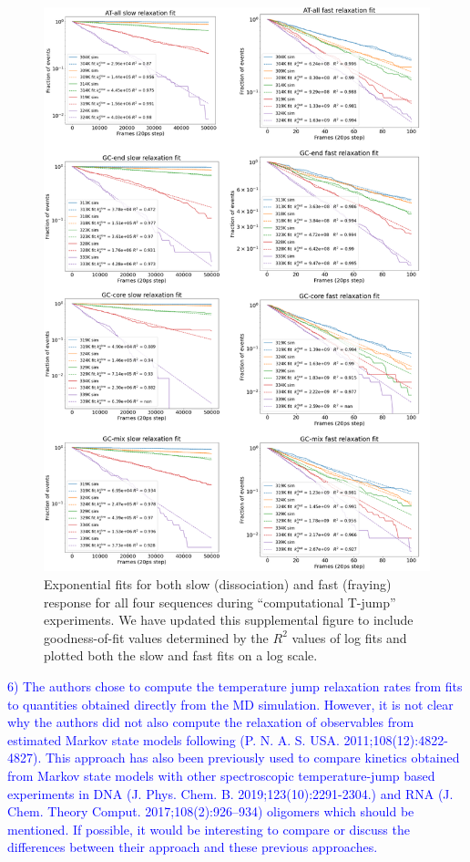 \documentclass[11pt,a4paper]{letter} %
\begin{document}
\begin{figure}[ht!]
	\begin{center}
        \includegraphics[width=120mm]{cover_letter/revision_figures/goodness_of_fit.png}
        \caption{Exponential fits for both slow (dissociation) and fast (fraying) response for all four sequences during ``computational T-jump'' experiments. We have updated this supplemental figure to include goodness-of-fit values determined by the $R^2$ values of log fits and plotted both the slow and fast fits on a log scale.}
        \label{fig:goodness-of-fit}
	\end{center}
\end{figure}

\textcolor{blue}{6)       The authors chose to compute the temperature jump relaxation rates from fits to quantities obtained directly from the MD simulation. However, it is not clear why the authors did not also compute the relaxation of observables from estimated Markov state models following (P. N. A. S. USA. 2011;108(12):4822-4827). This approach has also been previously used to compare kinetics obtained from Markov state models with other spectroscopic temperature-jump based experiments in DNA (J. Phys. Chem. B. 2019;123(10):2291-2304.) and RNA (J. Chem. Theory Comput. 2017;108(2):926–934) oligomers which should be mentioned. If possible, it would be interesting to compare or discuss the differences between their approach and these previous approaches.}
\end{document}
